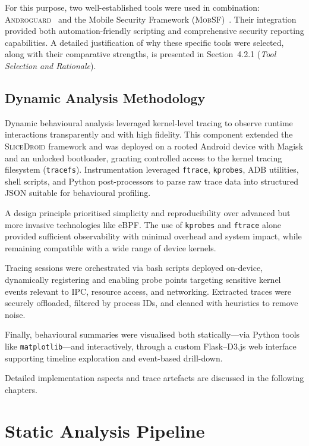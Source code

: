 \documentclass[a4paper,12pt]{report}
\begin{document}
For this purpose, two well-established tools were used in combination: \textsc{Androguard}~\cite{androguard2023} and the Mobile Security Framework (\textsc{MobSF})~\cite{mobsf2023}. Their integration provided both automation-friendly scripting and comprehensive security reporting capabilities. A detailed justification of why these specific tools were selected, along with their comparative strengths, is presented in Section~4.2.1 (\emph{Tool Selection and Rationale}).

\subsection{Dynamic Analysis Methodology}

Dynamic behavioural analysis leveraged kernel-level tracing to observe runtime interactions transparently and with high fidelity. This component extended the \textsc{SliceDroid} framework and was deployed on a rooted Android device with Magisk and an unlocked bootloader, granting controlled access to the kernel tracing filesystem (\texttt{tracefs}). Instrumentation leveraged \texttt{ftrace}, \texttt{kprobes}, ADB utilities, shell scripts, and Python post-processors to parse raw trace data into structured JSON suitable for behavioural profiling.

A design principle prioritised simplicity and reproducibility over advanced but more invasive technologies like eBPF. The use of \texttt{kprobes} and \texttt{ftrace} alone provided sufficient observability with minimal overhead and system impact, while remaining compatible with a wide range of device kernels.

Tracing sessions were orchestrated via bash scripts deployed on-device, dynamically registering and enabling probe points targeting sensitive kernel events relevant to IPC, resource access, and networking. Extracted traces were securely offloaded, filtered by process IDs, and cleaned with heuristics to remove noise.

Finally, behavioural summaries were visualised both statically—via Python tools like \texttt{matplotlib}—and interactively, through a custom Flask–D3.js web interface supporting timeline exploration and event-based drill-down.

Detailed implementation aspects and trace artefacts are discussed in the following chapters.

\section{Static Analysis Pipeline}
\end{document}

